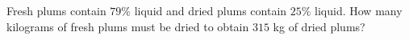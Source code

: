 Fresh plums contain $79\%$ liquid and dried plums contain $25\%$ liquid. How many kilograms of fresh plums must be dried to obtain $315$ kg of dried plums?
